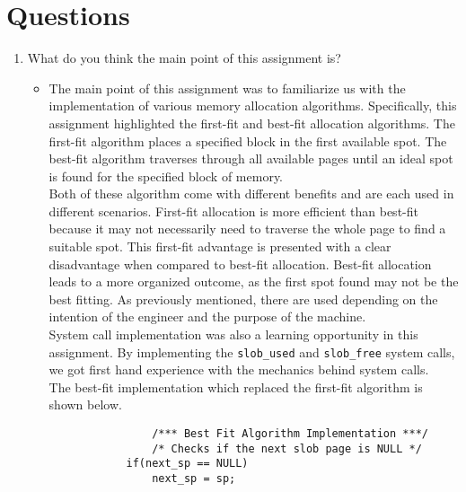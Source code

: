\documentclass[letterpaper,10pt,onecolumn]{IEEEtran}
\newcommand\tab[1][1cm]{\hspace*{#1}}
\begin{document}
    \section*{Questions}
    \begin{enumerate}
        \item What do you think the main point of this assignment is?
        \begin{itemize}
            \item \tab The main point of this assignment was to familiarize us with the implementation of various memory allocation algorithms. Specifically, this assignment highlighted the first-fit and best-fit allocation algorithms. The first-fit algorithm places a specified block in the first available spot. The best-fit algorithm traverses through all available pages until an ideal spot is found for the specified block of memory.\\
            \tab Both of these algorithm come with different benefits and are each used in different scenarios. First-fit allocation is more efficient than best-fit because it may not necessarily need to traverse the whole page to find a suitable spot. This first-fit advantage is presented with a clear disadvantage when compared to best-fit allocation. Best-fit allocation leads to a more organized outcome, as the first spot found may not be the best fitting. As previously mentioned, there are used depending on the intention of the engineer and the purpose of the machine.\\
            \tab System call implementation was also a learning opportunity in this assignment. By implementing the \texttt{slob\_used} and \texttt{slob\_free} system calls, we got first hand experience with the mechanics behind system calls. \\
            The best-fit implementation which replaced the first-fit algorithm is shown below.
            
                    
            \begin{lstlisting}
                /*** Best Fit Algorithm Implementation ***/
                /* Checks if the next slob page is NULL */
    		if(next_sp == NULL)
    			next_sp = sp;
    		

\end{lstlisting}
\end{itemize}
\end{enumerate}
\end{document}
